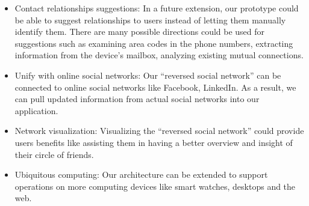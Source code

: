 \begin{itemize}
    \item {Contact relationships suggestions: In a future extension, our prototype could be able to suggest relationships to users instead of letting them manually identify them. There are many possible directions could be used for suggestions such as examining area codes in the phone numbers, extracting information from the device's mailbox, analyzing existing mutual connections.}
    \item {Unify with online social networks: Our ``reversed social network'' can be connected to online social networks like Facebook, LinkedIn. As a result, we can pull updated information from actual social networks into our application.} 
    \item {Network visualization: Visualizing the ``reversed social network'' could provide users benefits like assisting them in having a better overview and insight of their circle of friends.}
    \item {Ubiquitous computing: Our architecture can be extended to support operations on more computing devices like smart watches, desktops and the web.}
\end{itemize}


